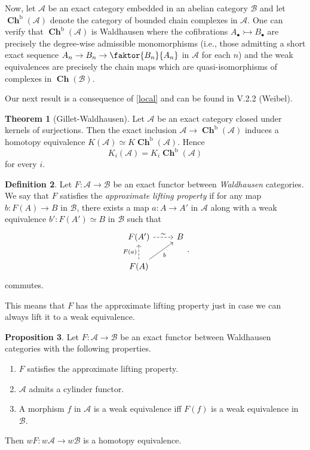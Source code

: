 \documentclass[10pt,letterpaper,cm]{nupset}
\theoremstyle{definition}
\newtheorem{definition}{Definition}[section]
\theoremstyle{theorem}
\newtheorem{theorem}[definition]{Theorem}
\newtheorem{prop}[definition]{Proposition}
\theoremstyle{remark}
\newcommand{\1}{\mathbf{1}}
\renewcommand{\a}{\mathscr{A}}
\renewcommand{\b}{\mathscr{B}}
\newcommand{\0}{\vec 0}
\DeclareMathOperator{\bo}{b}
\DeclareMathOperator{\ch}{\mathbf{Ch}}
\begin{document}
\smallskip

Now, let $\a$ be an exact category embedded in an abelian category $\b$ and let $\ch^{\bo}(\a)$ denote the category of bounded chain complexes in $\a$. One can verify that $\ch^{\bo}(\a)$ is Waldhausen where the cofibrations $A_{\bullet} \rightarrowtail B_{\bullet}$ are precisely the degree-wise admissible monomorphisms (i.e., those admitting a short exact sequence $A_n \to B_n \to \faktor{B_n}{A_n}$ in $\a$ for each $n$) and the weak equivalences are precisely the chain maps which are quasi-isomorphisms of complexes in $\ch(\b)$.

\medskip

Our next result is a consequence of \cref{local} and can be found in V.2.2 (Weibel).

\begin{theorem}[Gillet-Waldhausen]\label{GW}
Let $\a$ be an exact category closed under kernels of surjections. Then the exact inclusion $\a \to \ch^{\bo}(\a)$ induces a homotopy equivalence $K(\a) \simeq K\ch^{\bo}(\a)$. Hence $$K_i(\a) = K_i \ch^{\bo}(\a)$$ for every $i$.
\end{theorem}

\begin{definition}
Let $F: \a \to \b$ be an exact functor between \emph{Waldhausen} categories. We say that $F$ satisfies the \textit{approximate lifting property} if for any map $b: F(A) \to B$ in $\b$, there exists a map $a : A \to A'$ in $\a$ along with a weak equivalence $b' : F(A') \simeq B$ in $\b$ such that
\[
\begin{tikzcd}
F(A') \arrow[r, "\sim", dashed] & B \\
F(A) \arrow[u, "F(a)", dashed] \arrow[ru, "b"'] & 
\end{tikzcd}.
\]
commutes.
\end{definition}

This means that $F$ has the approximate lifting property just in case we can always lift it to  a weak equivalence.

\begin{prop}\label{pp}
Let $F: \a \to \b$ be an exact functor between Waldhausen categories with the following properties.
\begin{enumerate}
\item $F$ satisfies the approximate lifting property.
\item $\a$ admits a cylinder functor.
\item A morphism $f$ in $\a$ is a weak equivalence iff $F(f)$ is a weak equivalence in $\b$.
\end{enumerate}
Then $wF : w{\a} \to w{\b}$ is a homotopy equivalence.
\end{prop}
\end{document}
